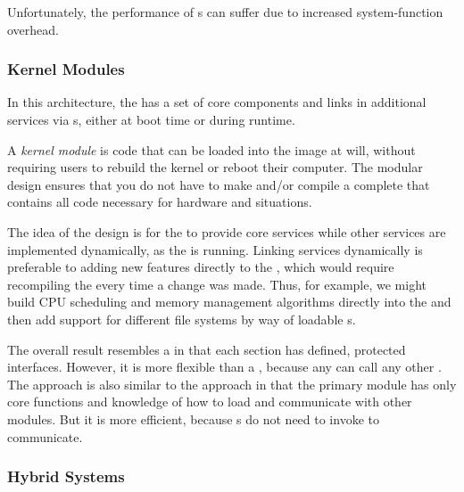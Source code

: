 Unfortunately, the performance of s can suffer due to increased system-function overhead.

\subsubsection{Kernel Modules}\label{subsubsec:Kernel_Modules}
In this architecture, the  has a set of core components and links in additional services via s, either at boot time or during runtime.

\begin{definition}\label{def:Kernel_Module}
  A \emph{kernel module} is code that can be loaded into the  image at will, without requiring users to rebuild the kernel or reboot their computer.
  The modular design ensures that you do not have to make and/or compile a complete  that contains all code necessary for hardware and situations.
\end{definition}

The idea of the design is for the  to provide core services while other services are implemented dynamically, as the  is running.
Linking services dynamically is preferable to adding new features directly to the , which would require recompiling the  every time a change was made.
Thus, for example, we might build CPU scheduling and memory management algorithms directly into the  and then add support for different file systems by way of loadable s.

The overall result resembles a  in that each  section has defined, protected interfaces.
However, it is more flexible than a , because any  can call any other .
The approach is also similar to the  approach in that the primary module has only core functions and knowledge of how to load and communicate with other modules.
But it is more efficient, because s do not need to invoke  to communicate.

\subsubsection{Hybrid Systems}\label{subsubsec:Hybrid_Systems}

